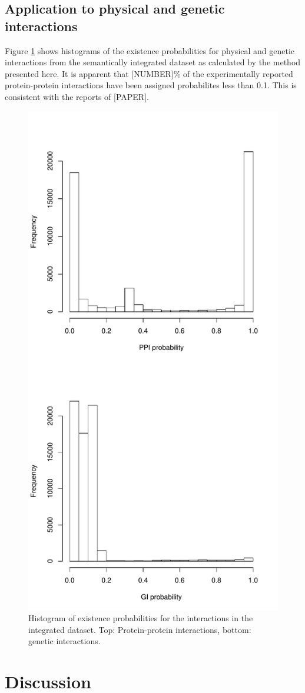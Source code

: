 \documentclass{bioinfo}
\newcommand{\note}[1]{{\color{red}[#1]}}
\begin{document}
\subsection{Application to physical and genetic interactions}

Figure \ref{ppi+gi} shows histograms of the existence probabilities for physical and genetic interactions from the semantically integrated dataset as calculated by the method presented here. It is apparent that \note{NUMBER}\% of the experimentally reported protein-protein interactions have been assigned probabilites less than 0.1. This is consistent with the reports of \note{PAPER}.


\begin{figure}[!tpb]
\centerline{\includegraphics[width=.5\textwidth]{fig2.pdf}}
\caption{Histogram of existence probabilities for the interactions in the integrated dataset. Top: Protein-protein interactions, bottom: genetic interactions.}
\label{ppi+gi}
\end{figure}


\section{Discussion}
\end{document}
